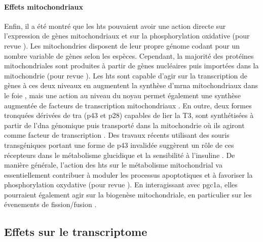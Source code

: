 \documentclass[../main.tex]{subfiles}
\begin{document}
\paragraph{Effets mitochondriaux}
Enfin, il a été montré que les \glspl{ht} pouvaient avoir une action directe sur l'expression de gènes mitochondriaux et sur la phosphorylation oxidative (pour revue \citealp{Wrutniak-Cabello2001}).
Les mitochondries disposent de leur propre génome codant pour un nombre variable de gènes selon les espèces.
Cependant, la majorité des protéines mitochondriales sont produites à partir de gènes nucléaires puis importées dans la mitochondrie (pour revue \citealp{Schaffer2007}).
Les \glspl{ht} sont capable d'agir sur la transcription de gènes à ces deux niveaux en augmentent la synthèse d’\gls{mrna} mitochondriaux dans le foie \citep{Enriquez1999}, mais une action au niveau du noyau permet également une synthèse augmentée de facteurs de transcription mitochondriaux \citep{Garstka1994}.
En outre, deux formes tronquées dérivées de \gls{tra} (p43 et p28) capables de lier la T3, sont synthétisées à partir de l'\gls{dna} génomique puis transporté dans la mitochondrie où ils agiront comme facteur de transcription \citep{Wrutniak1995}.
Des travaux récents utilisant des souris transgéniques portant une forme de p43 invalidée suggèrent un rôle de ces récepteurs dans le métabolisme glucidique et la sensibilité à l'insuline \citep{Bertrand2013}.
De manière générale, l'action des \glspl{ht} sur le métabolisme mitochondrial va essentiellement contribuer à moduler les processus apoptotiques et à favoriser la phosphorylation oxydative (pour revue \citealp{Psarra2008}).
En interagissant avec \gls{pgc1a}, elles pourraient également agir sur la biogenèse mitochondriale, en particulier sur les évenements de fission/fusion \citep{Ventura-Clapier2008}.


\subsection{Effets sur le transcriptome}
\end{document}
